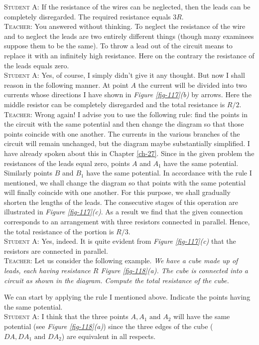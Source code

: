 \documentclass[a4paper,sfsidenotes]{tufte-book}
\begin{document}
\textsc{Student A:} If the resistance of the wires can be neglected, then the leads can be completely disregarded. The required resistance equals $3R$.
\\
\textsc{Teacher:} You answered without thinking. To neglect the resistance of the wire and to neglect the leads are two entirely different things (though many examinees suppose them to be the same). To throw a lead out of the circuit means to replace it with an infinitely high resistance. Here on the contrary the resistance of the leads equals zero.
\\
\textsc{Student A:} Yes, of course, I simply didn't give it any thought. But now I shall reason in the following manner. At point $A$ the current will be divided into two currents whose directions I have shown in \emph{Figure \ref{fig-117}(b)} by arrows. Here the middle resistor can be completely disregarded and the total resistance is $R/2$.
\\
\textsc{Teacher:} Wrong again! I advise you to use the following rule: find the points in the circuit with the same potential and then change the diagram so that those points coincide with one another. The currents in the various branches of the circuit will remain unchanged, but the diagram maybe substantially simplified. I have already spoken about this in Chapter \ref{ch-27}. Since in the given problem the resistances of the leads equal zero, points $A$ and $A_1$ have the same potential. Similarly points $B$ and $B_1$ have the same potential. In accordance with the rule I mentioned, we shall change the diagram so that points with the same potential will finally coincide with one another. For this purpose, we shall gradually shorten the lengths of the leads. The consecutive stages of this operation are illustrated in \emph{Figure \ref{fig-117}(c)}. As a result we find that the given connection corresponds to an arrangement with three resistors connected in parallel. Hence, the total resistance of the portion is $R/3$. 
\\
\textsc{Student A:} Yes, indeed. It is quite evident from \emph{Figure \ref{fig-117}(c)} that the resistors are connected in parallel.
\\
\textsc{Teacher:} Let us consider the following example. \emph{ We have a cube made up of leads, each having resistance $R$ \emph{Figure \ref{fig-118}(a)}. The cube is connected into a circuit as shown in the diagram. Compute the total resistance of the cube.}

We can start by applying the rule I mentioned above. Indicate the points having the same potential.
\\
\textsc{Student A:} I think that the three points $A, A_{1} \,\, \text{and}\,\, A_{2}$ will have the same potential (see \emph{Figure \ref{fig-118}(a)}) since the three edges of the cube ($DA, DA_{1} \,\, \text{and}\,\, DA_{2}$) are equivalent in all respects.
\end{document}

